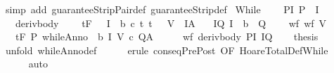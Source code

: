 \begin{isabellebody}
\isatagproof
{}\isamarkupfalse%
\ {\isacharparenleft}simp\ add{\isacharcolon}\ guaranteeStripPair{\isacharunderscore}def\ guaranteeStrip{\isacharunderscore}def{\isacharparenright}%
\endisatagproof
{\isafoldproof}%
%
\isadelimproof
\isanewline
%
\endisadelimproof
\isanewline
{}\isamarkupfalse%
\ While{\isacharcolon}\ \isanewline
\ \ \ P{\isacharunderscore}I{\isacharcolon}\ {\isachardoublequoteopen}P\ {\isasymsubseteq}\ I{\isachardoublequoteclose}\ \isanewline
\ \ \ deriv{\isacharunderscore}body{\isacharcolon}\ \isanewline
\ \ {\isachardoublequoteopen}{\isasymforall}{\isasymsigma}{\isachardot}\ {\isasymGamma}{\isacharcomma}{\isasymTheta}{\isasymturnstile}\isactrlsub t\isactrlbsub {\isacharslash}F\isactrlesub \ {\isacharparenleft}{\isacharbraceleft}{\isasymsigma}{\isacharbraceright}\ {\isasyminter}\ I\ {\isasyminter}\ b{\isacharparenright}\ c\ {\isacharparenleft}{\isacharbraceleft}t{\isachardot}\ {\isacharparenleft}t{\isacharcomma}\ {\isasymsigma}{\isacharparenright}\ {\isasymin}\ V{\isacharbraceright}\ {\isasyminter}\ I{\isacharparenright}{\isacharcomma}A{\isachardoublequoteclose}\isanewline
\ \ \ I{\isacharunderscore}Q{\isacharcolon}\ {\isachardoublequoteopen}I\ {\isasyminter}\ {\isacharminus}b\ {\isasymsubseteq}\ Q{\isachardoublequoteclose}\ \isanewline
\ \ \ wf{\isacharcolon}\ {\isachardoublequoteopen}wf\ V{\isachardoublequoteclose}\isanewline
\ \ \ {\isachardoublequoteopen}{\isasymGamma}{\isacharcomma}{\isasymTheta}{\isasymturnstile}\isactrlsub t\isactrlbsub {\isacharslash}F\isactrlesub \ P\ {\isacharparenleft}whileAnno\ \ b\ I\ V\ c{\isacharparenright}\ Q{\isacharcomma}A{\isachardoublequoteclose}\isanewline
%
\isadelimproof
%
\endisadelimproof
%
\isatagproof
{}\isamarkupfalse%
\ {\isacharminus}\isanewline
\ \ \isamarkupfalse%
\ wf\ deriv{\isacharunderscore}body\ P{\isacharunderscore}I\ I{\isacharunderscore}Q\isanewline
\ \ \isamarkupfalse%
\ {\isacharquery}thesis\isanewline
\ \ \ \ \isamarkupfalse%
\ {\isacharparenleft}unfold\ whileAnno{\isacharunderscore}def{\isacharparenright}\isanewline
\ \ \ \ \isamarkupfalse%
\ {\isacharparenleft}erule\ conseqPrePost\ {\isacharbrackleft}OF\ HoareTotalDef{\isachardot}While{\isacharbrackright}{\isacharparenright}\ \isanewline
\ \ \ \ \isamarkupfalse%
\ auto\isanewline
\ \ \ \ \isamarkupfalse%
\isanewline
{}\isamarkupfalse%
%
\endisatagproof
{\isafoldproof}%

\end{isabellebody}
